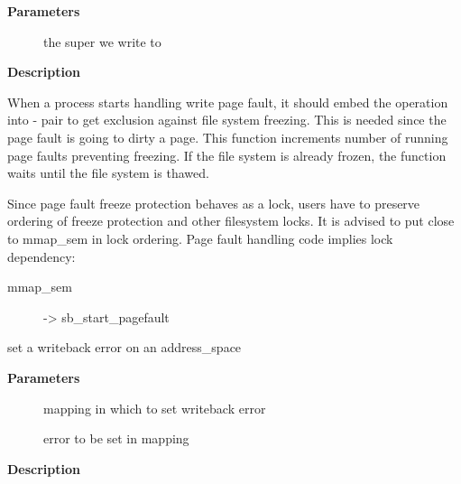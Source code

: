 \documentclass[a4paper,8pt,english]{sphinxmanual}
\begin{document}
\textbf{Parameters}
\begin{description}
\item[{}] \leavevmode
the super we write to

\end{description}

\textbf{Description}

When a process starts handling write page fault, it should embed the
operation into {\hyperref[filesystems/index:c.sb_start_pagefault]{\emph{}}} - {\hyperref[filesystems/index:c.sb_end_pagefault]{\emph{}}} pair to get
exclusion against file system freezing. This is needed since the page fault
is going to dirty a page. This function increments number of running page
faults preventing freezing. If the file system is already frozen, the
function waits until the file system is thawed.

Since page fault freeze protection behaves as a lock, users have to preserve
ordering of freeze protection and other filesystem locks. It is advised to
put {\hyperref[filesystems/index:c.sb_start_pagefault]{\emph{}}} close to mmap\_sem in lock ordering. Page fault
handling code implies lock dependency:
\begin{description}
\item[{mmap\_sem}] \leavevmode
-\textgreater{} sb\_start\_pagefault

\end{description}

\begin{fulllineitems}
\label{filesystems/index:c.filemap_set_wb_err}
set a writeback error on an address\_space

\end{fulllineitems}


\textbf{Parameters}
\begin{description}
\item[{}] \leavevmode
mapping in which to set writeback error

\item[{}] \leavevmode
error to be set in mapping

\end{description}

\textbf{Description}
\end{document}
